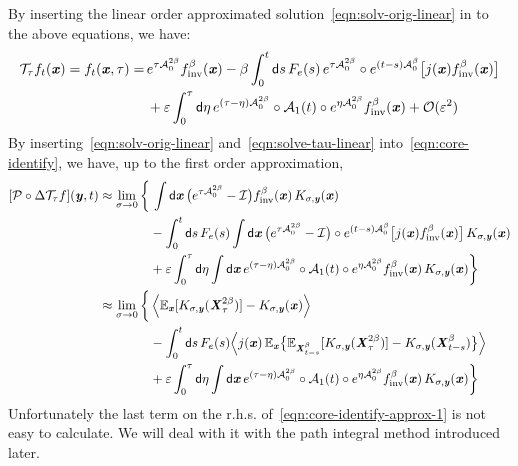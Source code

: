 \documentclass[aip,jcp,a4paper,reprint,onecolumn]{revtex4-1}
\newcommand{\vect}[1]{\textbf{\textit{#1}}}
\newcommand{\dd}{\textsf{d}}
\newcommand{\inv}{\textrm{inv}}
\newcommand{\mt}{\mathcal T}
\newcommand{\mo}{\mathcal O}
\newcommand{\mi}{\mathcal I}
\newcommand{\fwg}{{\mathcal A}}
\begin{document}
By inserting the linear order approximated solution~\eqref{eqn:solv-orig-linear}
in to the above equations, we have:
\begin{align}\nonumber
  \mt_\tau f_t(\vect x)=
  f_{t}(\vect x, \tau)
  =&\,
  e^{\tau\fwg^{2\beta}_0} f_{\inv}^\beta(\vect x) -
  \beta
  \int_0^t\dd s\,
  F_e(s)\,
  e^{\tau\fwg^{2\beta}_0} \circ
  e^{(t-s)\fwg^\beta_0}
  \big[
  j(\vect x)
  f_{\inv}^\beta(\vect x)
  \big]
  \\\label{eqn:solve-tau-linear}
  &\,+ \varepsilon
  \int_0^\tau\dd \eta\,
  e^{(\tau-\eta)\fwg^{2\beta}_0}\circ
  \fwg_1(t)\circ
  e^{\eta\fwg^{2\beta}_0}f_{\inv}^\beta(\vect x)  + \mo(\varepsilon^2)
\end{align}
By inserting~\eqref{eqn:solv-orig-linear} and~\eqref{eqn:solve-tau-linear}
into~\eqref{eqn:core-identify}, we have, up to the first order
approximation,
\begin{align}\nonumber
  [\mathcal P\circ\Delta\mt_\tau f](\vect y, t)
  \approx
  \lim_{\sigma \rightarrow 0}
  \bigg\{
    &\,
    \int \dd \vect x\,
    \big(e^{\tau\fwg_0^{2\beta}}-\mi\big)
    f_{\inv}^\beta(\vect x)\,
    K_{\sigma,\vect y}(\vect x)\\\nonumber
    &
    - \int_0^t\dd s\,
    F_e(s)
    \int\dd \vect x\,
    \big(e^{\tau\fwg^{2\beta}_0} - \mi\big)\circ
    e^{(t-s)\fwg^\beta_0}
    \big[
    j(\vect x)
    f_{\inv}^\beta(\vect x)
    \big]\, K_{\sigma,\vect y}(\vect x) \\\nonumber
    &
    +
    \varepsilon
    \int_0^\tau\dd \eta
    \int\dd \vect x\,
    e^{(\tau-\eta)\fwg^{2\beta}_0}\circ
    \fwg_1(t)\circ
    e^{\eta\fwg^{2\beta}_0}f_{\inv}^\beta(\vect x)\,K_{\sigma,\vect y}(\vect x)
    \bigg\}     \\\nonumber
  \approx
  \lim_{\sigma \rightarrow 0}
  \bigg\{
  &\,
    \Big\langle
    \mathbb E_{\vect x}[ K_{\sigma,\vect y}(\vect X^{2\beta}_\tau) ]
    - K_{\sigma,\vect y}(\vect x)
    \Big\rangle\\\nonumber
    &
    - \int_0^t\dd s\,
    F_e(s)
    \Big\langle
    j(\vect x)\,
    \mathbb E_{\vect x}\big\{
    \mathbb E_{\vect X_{t-s}^\beta}[
    K_{\sigma,\vect y}(\vect X_\tau^{2\beta})
    ]
    -
    K_{\sigma,\vect y}(\vect X_{t-s}^\beta)
    \big\}
    \Big\rangle\\\label{eqn:core-identify-approx-1}
    &
    +
    \varepsilon
    \int_0^\tau\dd \eta
    \int\dd \vect x\,
    e^{(\tau-\eta)\fwg^{2\beta}_0}\circ
    \fwg_1(t)\circ
    e^{\eta\fwg^{2\beta}_0}f_{\inv}^\beta(\vect x)\,K_{\sigma,\vect y}(\vect x)
    \bigg\}     
\end{align}
Unfortunately the last term on the r.h.s. of~\eqref{eqn:core-identify-approx-1}
is not easy to calculate. We will deal with it with
the path integral method introduced later.
\end{document}
